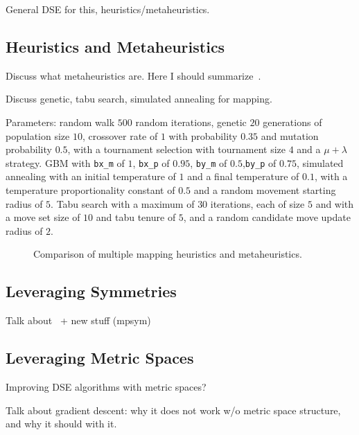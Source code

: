 General DSE for this, heuristics/metaheuristics.

\subsection{Heuristics and Metaheuristics}

Discuss what metaheuristics are.
Here I should summarize~\cite{goens_mcsoc16}.

Discuss genetic, tabu search, simulated annealing for mapping.

Parameters: random walk $500$ random iterations, genetic $20$ generations of population size $10$, crossover rate of $1$ with probability $0.35$ and mutation probability $0.5$, with a tournament selection with tournament size $4$ and a $\mu + \lambda$ strategy.
\ac{GBM} with \texttt{bx\_m} of $1$, \texttt{bx\_p} of $0.95$, \texttt{by\_m} of $0.5$,\texttt{by\_p} of $0.75$, 
simulated annealing with an initial temperature of $1$ and a final temperature of $0.1$, with a temperature proportionality constant of $0.5$  and a random movement starting radius of $5$.
Tabu search with a maximum of $30$ iterations, each of size $5$ and with a move set size of $10$ and tabu tenure of $5$, and a random candidate move update radius of $2$.

\begin{figure}[h]
	\centering
   \resizebox{0.95\textwidth}{!}{}
	\caption{Comparison of multiple mapping heuristics and metaheuristics.}
	\label{fig:metric_comparison}
\end{figure}

\subsection{Leveraging Symmetries}
Talk about~\cite{goens_taco17} + new stuff (mpsym)

\subsection{Leveraging Metric Spaces}
Improving DSE algorithms with metric spaces?

Talk about gradient descent: why it does not work w/o metric space structure, and why it should with it.
